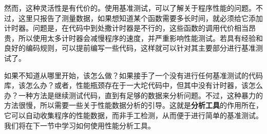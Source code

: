 然而，这种灵活性是有代价的。使用基准测试，可以了解关于程序性能的问题。不过，这里只报告了测量数据，如果想知道某个函数需要多长时间，就必须给它添加计时器。问题是，在代码中到处撒计时器是不行的，这些函数的调用代价相当昂贵，所以使用太多计时器会减慢程序的速度，并严重影响性能测试。若具有经验和良好的编码规则，可以提前编写一些代码，这样就可以针对其主要部分进行基准测试了。

如果不知道从哪里开始，该怎么做？如果接手了一个没有进行任何基准测试的代码库，该怎么办？或者，性能瓶颈存在于一大坨代码中，但其中没有计时器，该怎么办？一种方法是继续测试代码，直到有足够的数据来分析问题。不过，这种暴力的方法很慢，所以需要一些关于性能数据分析的引导。这就是\textbf{分析工具}的作用所在，它可以自动收集程序的性能数据，而非手工检测，从而便于进行简单的基准测试。我们将在下一节中学习如何使用性能分析工具。






